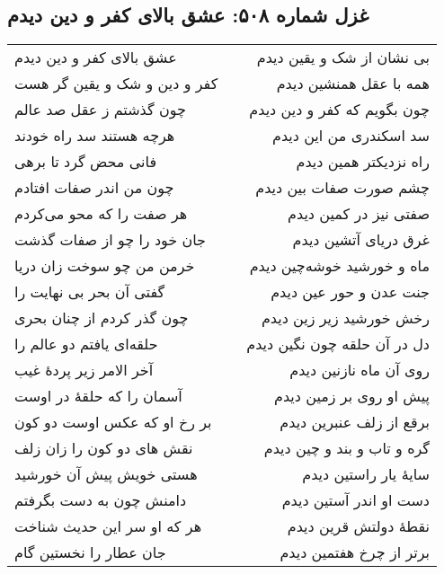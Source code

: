 \begin{center}
\section*{غزل شماره ۵۰۸: عشق بالای کفر و دین دیدم}
\label{sec:508}
\begin{longtable}{l p{0.5cm} r}
عشق بالای کفر و دین دیدم
&&
بی نشان از شک و یقین دیدم
\\
کفر و دین و شک و یقین گر هست
&&
همه با عقل همنشین دیدم
\\
چون گذشتم ز عقل صد عالم
&&
چون بگویم که کفر و دین دیدم
\\
هرچه هستند سد راه خودند
&&
سد اسکندری من این دیدم
\\
فانی محض گرد تا برهی
&&
راه نزدیکتر همین دیدم
\\
چون من اندر صفات افتادم
&&
چشم صورت صفات بین دیدم
\\
هر صفت را که محو می‌کردم
&&
صفتی نیز در کمین دیدم
\\
جان خود را چو از صفات گذشت
&&
غرق دریای آتشین دیدم
\\
خرمن من چو سوخت زان دریا
&&
ماه و خورشید خوشه‌چین دیدم
\\
گفتی آن بحر بی نهایت را
&&
جنت عدن و حور عین دیدم
\\
چون گذر کردم از چنان بحری
&&
رخش خورشید زیر زین دیدم
\\
حلقه‌ای یافتم دو عالم را
&&
دل در آن حلقه چون نگین دیدم
\\
آخر الامر زیر پردهٔ غیب
&&
روی آن ماه نازنین دیدم
\\
آسمان را که حلقهٔ در اوست
&&
پیش او روی بر زمین دیدم
\\
بر رخ او که عکس اوست دو کون
&&
برقع از زلف عنبرین دیدم
\\
نقش های دو کون را زان زلف
&&
گره و تاب و بند و چین دیدم
\\
هستی خویش پیش آن خورشید
&&
سایهٔ یار راستین دیدم
\\
دامنش چون به دست بگرفتم
&&
دست او اندر آستین دیدم
\\
هر که او سر این حدیث شناخت
&&
نقطهٔ دولتش قرین دیدم
\\
جان عطار را نخستین گام
&&
برتر از چرخ هفتمین دیدم
\\
\end{longtable}
\end{center}

